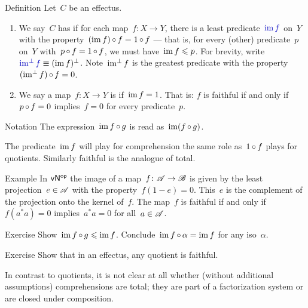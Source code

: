 \documentclass[b]{subfiles}
\begin{document}
\begin{parsec}%
\begin{point}{Definition}%
Let~$C$ be an effectus.
\begin{enumerate}
\item
We say~$C$ has 
    if for each map~$f\colon X \to Y$,
    there is a least predicate~$\Define{\IM f}$ on~$Y$
        with the property~$(\operatorname{im} f) \mathop{\circ} f = 1 \mathop{\circ} f$ ---
        that is, 
    for every (other) predicate~$p$ on~$Y$
    with~$p \mathop{\circ} f = 1 \mathop{\circ} f$,
    we must have~$\operatorname{im} f \leqslant p$.
For brevity, write~$\Define{\IMperp f} \equiv (\IM f)^\perp$. 
Note~$\operatorname{im^\perp} f$ is the greatest predicate
with the property~$(\operatorname{im^\perp} f) \mathop{\circ} f = 0$.
\item
We say a map~$f\colon X \to Y$ is 
    if~$\operatorname{im} f = 1$.
That is: $f$ is faithful if and only if
    $p \mathop{\circ} f = 0$ implies~$f = 0$
    for every predicate~$p$.
\end{enumerate}
\begin{point}{Notation}%
The expression~$\operatorname{im} f \mathop{\circ} g$
    is read as~$\operatorname{im} (f \mathop{\circ} g)$.
\end{point}
\begin{point}%
The predicate~$\operatorname{im} f$ will play for comprehension the same role
    as~$1 \mathop{\circ} f$ plays for quotients.
Similarly faithful is the analogue of total.
\end{point}
\end{point}
\begin{point}{Example}%
In ${\mathsf{vN}}{^{\mathsf{op}}}$ the image of a map~$f\colon \mathscr{A} \to \mathscr{B}$
    is given by the least projection~$e \in \mathscr{A}$
    with the property~$f(1-e) = 0$.
This~$e$ is the complement of the projection onto the kernel of~$f$.
The map~$f$ is faithful if and only
    if~$f(a^*a)=0$ implies~$a^*a = 0$
    for all~$a\in \mathscr{A}$.
\end{point}
\begin{point}[im-ineq]{Exercise}%
Show~$\operatorname{im} f \mathop{\circ} g \leqslant \operatorname{im} f$.
Conclude~$\operatorname{im} f \mathop{\circ} \alpha = \operatorname{im} f$
    for any iso~$\alpha$.
\end{point}
\begin{point}{Exercise}%
Show that in an effectus, any quotient is faithful.
\end{point}
\begin{point}%
In contrast to quotients,
    it is not clear at all whether (without additional assumptions)
    comprehensions are total;
    they are part of a factorization system
    or are closed under composition.
\end{point}

\end{parsec}
\end{document}
